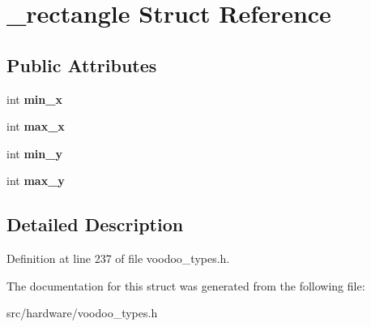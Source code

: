 \hypertarget{struct__rectangle}{\section{\-\_\-rectangle Struct Reference}
\label{struct__rectangle}
}
\subsection*{Public Attributes}
\begin{DoxyCompactItemize}
\item 
\hypertarget{struct__rectangle_a400c0b48f38a20fbbd24c3af6a170715}{int {\bfseries min\-\_\-x}}\label{struct__rectangle_a400c0b48f38a20fbbd24c3af6a170715}

\item 
\hypertarget{struct__rectangle_ac58c3f724e76d841fecac3c0ed9cc1ec}{int {\bfseries max\-\_\-x}}\label{struct__rectangle_ac58c3f724e76d841fecac3c0ed9cc1ec}

\item 
\hypertarget{struct__rectangle_a5e0444616b00dffe8b1414aaed7fefde}{int {\bfseries min\-\_\-y}}\label{struct__rectangle_a5e0444616b00dffe8b1414aaed7fefde}

\item 
\hypertarget{struct__rectangle_abb40004a804c33419a4b45a12430f59d}{int {\bfseries max\-\_\-y}}\label{struct__rectangle_abb40004a804c33419a4b45a12430f59d}

\end{DoxyCompactItemize}


\subsection{Detailed Description}


Definition at line 237 of file voodoo\-\_\-types.\-h.



The documentation for this struct was generated from the following file\-:\begin{DoxyCompactItemize}
\item 
src/hardware/voodoo\-\_\-types.\-h\end{DoxyCompactItemize}
